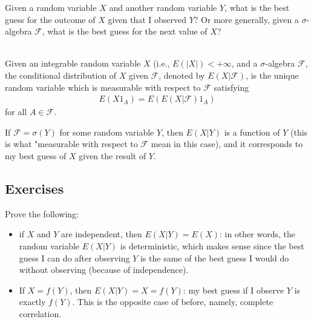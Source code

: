 \documentclass[12pt]{article}
\begin{document}
Given a random variable $X$ and another random variable $Y$, what is the best guess for the outcome of $X$ given that I observed $Y$? Or more generally, given a $\sigma$-algebra $\mathcal F$, what is the best guess for the next value of $X$?\\ \\
\begin{definition}
Given an integrable random variable $X$ (i.e., $E(|X|)<+\infty$, and a $\sigma$-algebra $\mathcal F$, the conditional distribution of $X$ given $\mathcal F$, denoted by $E(X|\mathcal F)$, is the unique random variable which is measurable with respect to $\mathcal F$ satisfying
\begin{align*}
E(X1_A)=E(E(X|\mathcal F)1_A)
\end{align*}
for all $A\in \mathcal F$.
\end{definition}
If $\mathcal F=\sigma(Y)$ for some random variable $Y$, then $E(X|Y)$ is a function of $Y$ (this is what "measurable with respect to $\mathcal F$ mean in this case), and it corresponds to my best guess of $X$ given the result of $Y$.
\subsection{Exercises}
Prove the following: 
\begin{itemize}
\item if $X$ and $Y$ are independent, then $E(X|Y)=E(X)$: in other words, the random variable $E(X|Y)$ is deterministic, which makes sense since the best guess I can do after observing $Y$ is the same of the best guess I would do without observing (because of independence).
\item If $X=f(Y)$, then $E(X|Y)=X=f(Y)$: my best guess if I observe $Y$ is exactly $f(Y)$. This is the opposite case of before, namely, complete correlation. 
\end{itemize}
\end{document}
